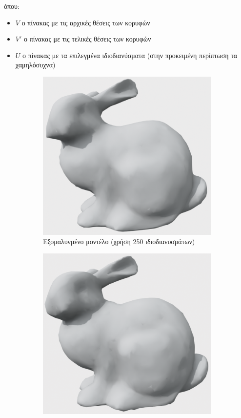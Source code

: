 \documentclass[draft]{article}
\begin{document}
όπου:
\begin{itemize}
	\item $V$ ο πίνακας με τις αρχικές θέσεις των κορυφών
	\item $V'$ ο πίνακας με τις τελικές θέσεις των κορυφών
	\item $U$ ο πίνακας με τα επιλεγμένα ιδιοδιανύσματα
		(στην προκειμένη περίπτωση τα χαμηλόσυχνα)
\end{itemize}

\begin{figure}[h]
	\centering
	\begin{subfigure}{0.4\textwidth}
		\includegraphics[width=\textwidth]{"250_eigs.png"}
		\caption{Εξομαλυνμένο μοντέλο (χρήση 250 ιδιοδιανυσμάτων)}
	\end{subfigure}
	\begin{subfigure}{0.4\textwidth}
		\includegraphics[width=\textwidth]{"1000_eigs.png"}

\end{subfigure}
\end{figure}
\end{document}
